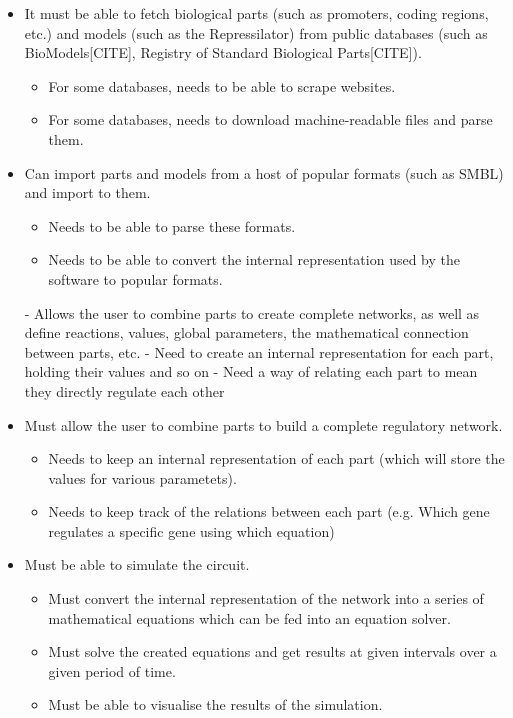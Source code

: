 \documentclass{article}
\begin{document}
		
		
		\begin{itemize}
			\item It must be able to fetch biological parts (such as promoters, coding regions, etc.) and models (such as the Repressilator) from public databases (such as BioModels[CITE], Registry of Standard Biological Parts[CITE]).
				\begin{itemize}
					\item For some databases, needs to be able to scrape websites.
					\item For some databases, needs to download machine-readable files and parse them.
				\end{itemize}
			
			\item Can import parts and models from a host of popular formats (such as SMBL) and import to them.
				\begin{itemize}
					\item Needs to be able to parse these formats.
					\item Needs to be able to convert the internal representation used by the software to popular formats.
				\end{itemize}
			
			
			- Allows the user to combine parts to create complete networks, as well as define reactions, values, global parameters, the mathematical connection between parts, etc.
			- Need to create an internal representation for each part, holding their values and so on
			- Need a way of relating each part to mean they directly regulate each other
			
			\item Must allow the user to combine parts to  build a complete regulatory network.
			\begin{itemize}
				\item Needs to keep an internal representation of each part (which will store the values for various parametets).
				\item Needs to keep track of the relations between each part (e.g. Which gene regulates a specific gene using which equation)	
			\end{itemize}
		
			\item Must be able to simulate the circuit.
			\begin{itemize}
				\item Must convert the internal representation of the network into a series of mathematical equations which can be fed into an equation solver.
				\item Must solve the created equations and get results at given intervals over a given period of time.
				\item Must be able to visualise the results of the simulation.
			\end{itemize}
		

\end{itemize}
\end{document}
